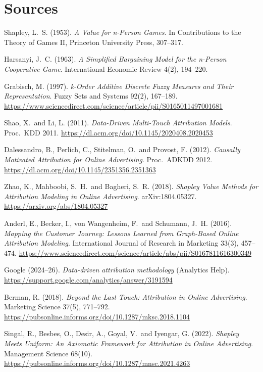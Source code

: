 \section*{Sources}
\begingroup\raggedright
\begin{enumerate}[label={[\arabic*]},leftmargin=2.5em]
\item Shapley, L.\ S. (1953). \emph{A Value for n-Person Games}. In Contributions to the Theory of Games II, Princeton University Press, 307--317.
\item Harsanyi, J.\ C. (1963). \emph{A Simplified Bargaining Model for the n-Person Cooperative Game}. International Economic Review 4(2), 194--220.
\item Grabisch, M. (1997). \emph{k-Order Additive Discrete Fuzzy Measures and Their Representation}. Fuzzy Sets and Systems 92(2), 167--189. \url{https://www.sciencedirect.com/science/article/pii/S0165011497001681}
\item Shao, X.\ and Li, L. (2011). \emph{Data-Driven Multi-Touch Attribution Models}. Proc.\ KDD 2011. \url{https://dl.acm.org/doi/10.1145/2020408.2020453}
\item Dalessandro, B., Perlich, C., Stitelman, O.\ and Provost, F. (2012). \emph{Causally Motivated Attribution for Online Advertising}. Proc.\ ADKDD 2012. \url{https://dl.acm.org/doi/10.1145/2351356.2351363}
\item Zhao, K., Mahboobi, S.\ H.\ and Bagheri, S.\ R. (2018). \emph{Shapley Value Methods for Attribution Modeling in Online Advertising}. arXiv:1804.05327. \url{https://arxiv.org/abs/1804.05327}
\item Anderl, E., Becker, I., von Wangenheim, F.\ and Schumann, J.\ H. (2016). \emph{Mapping the Customer Journey: Lessons Learned from Graph-Based Online Attribution Modeling}. International Journal of Research in Marketing 33(3), 457--474. \url{https://www.sciencedirect.com/science/article/abs/pii/S0167811616300349}
\item Google (2024--26). \emph{Data-driven attribution methodology} (Analytics Help). \url{https://support.google.com/analytics/answer/3191594}
\item Berman, R. (2018). \emph{Beyond the Last Touch: Attribution in Online Advertising}. Marketing Science 37(5), 771--792. \url{https://pubsonline.informs.org/doi/10.1287/mksc.2018.1104}
\item Singal, R., Besbes, O., Desir, A., Goyal, V.\ and Iyengar, G. (2022). \emph{Shapley Meets Uniform: An Axiomatic Framework for Attribution in Online Advertising}. Management Science 68(10). \url{https://pubsonline.informs.org/doi/10.1287/mnsc.2021.4263}

\end{enumerate}
